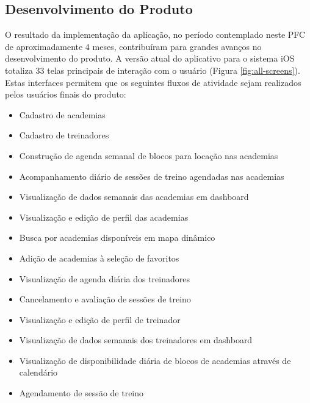 \subsection{Desenvolvimento do Produto}
O resultado da implementação da aplicação, no período contemplado neste PFC de aproximadamente 4 meses, contribuíram para grandes avanços no desenvolvimento do produto. A versão atual do aplicativo para o sistema iOS totaliza 33 telas principais de interação com o usuário (Figura \ref{fig:all-screens}). Estas interfaces permitem que os seguintes fluxos de atividade sejam realizados pelos usuários finais do produto:
\begin{itemize}
    \item Cadastro de academias
    \item Cadastro de treinadores
    \item Construção de agenda semanal de blocos para locação nas academias
    \item Acompanhamento diário de sessões de treino agendadas nas academias
    \item Visualização de dados semanais das academias em dashboard
    \item Visualização e edição de perfil das academias
    \item Busca por academias disponíveis em mapa dinâmico
    \item Adição de academias à seleção de favoritos
    \item Visualização de agenda diária dos treinadores
    \item Cancelamento e avaliação de sessões de treino
    \item Visualização e edição de perfil de treinador
    \item Visualização de dados semanais dos treinadores em dashboard
    \item Visualização de disponibilidade diária de blocos de academias através de calendário
    \item Agendamento de sessão de treino
\end{itemize}
